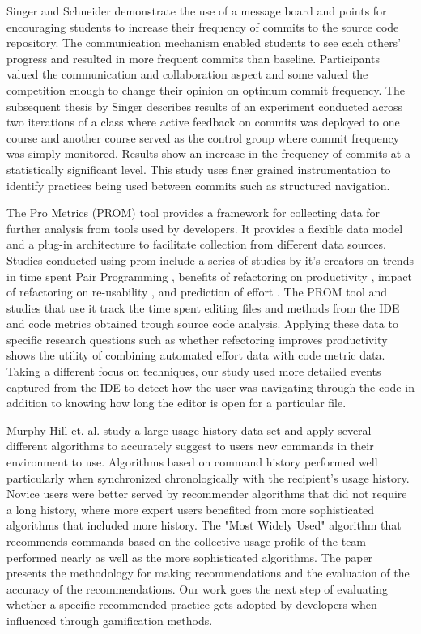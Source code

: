 \documentclass{sig-alternate}
\begin{document}
Singer and Schneider demonstrate the use of a message board and points for encouraging students to increase their frequency of commits to the source code repository.\cite{Singer2012It}  The communication mechanism enabled students to see each others' progress and resulted in more frequent commits than baseline.  Participants valued the communication and collaboration aspect and some valued the competition enough to change their opinion on optimum commit frequency.  The subsequent thesis by Singer \cite{Singer2013a} describes results of an experiment conducted across two iterations of a class where active feedback on commits was deployed to one course and another course served as the control group where commit frequency was simply monitored.  Results show an increase in the frequency of commits at a statistically significant level.  This study uses finer grained instrumentation to identify practices being used between commits such as structured navigation.

The Pro Metrics (PROM) tool provides a framework for collecting data for further analysis from tools used by developers.\cite{Coman2009Casestudy}  It provides a flexible data model and a plug-in architecture to facilitate collection from different data sources.  Studies conducted using prom include a series of studies by it's creators on trends in time spent Pair Programming \cite{Coman2008Investigating}, benefits of refactoring on productivity \cite{Moser2008Case}, impact of refactoring on re-usability \cite{Moser2006Does}, and prediction of effort \cite{Abrahamsson2007Effort}.  The PROM tool and studies that use it track the time spent editing files and methods from the IDE and code metrics obtained trough source code analysis.  Applying these data to specific research questions such as whether refectoring improves productivity \cite{Moser2008Case} shows the utility of combining automated effort data with code metric data.  Taking a different focus on techniques, our study used more detailed events captured from the IDE  to detect how the user was navigating through the code in addition to knowing how long the editor is open for a particular file.

Murphy-Hill et. al. study a large usage history data set and apply several different algorithms to accurately suggest to users new commands in their environment to use.\cite{MurphyHill2012Improving} Algorithms based on command history performed well particularly when synchronized chronologically with the recipient's usage history. Novice users were better served by recommender algorithms that did not require a long history, where more expert users benefited from more sophisticated algorithms that included more history. The "Most Widely Used" algorithm that recommends commands based on the collective usage profile of the team performed nearly as well as the more sophisticated algorithms. The paper presents the methodology for making recommendations and the evaluation of the accuracy of the recommendations. Our work goes the next step of evaluating whether a specific recommended practice gets adopted by developers when influenced through gamification methods.
\end{document}
